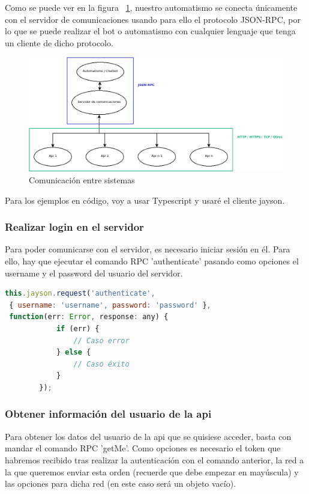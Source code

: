 \documentclass[spanish,12pt, a4paper, twoside]{paper}
\begin{document}
Como se puede ver en la figura ~\ref{fig:Comunicación entre sistemas}, nuestro automatismo se conecta únicamente con el servidor de comunicaciones usando para ello el protocolo JSON-RPC, por lo que se puede realizar el bot o automatismo con cualquier lenguaje que tenga un cliente de dicho protocolo.

\begin{figure}
\centering
	\includegraphics[width=\textwidth]{recursos/Comunication}
\caption{Comunicación entre sistemas}
\label{fig:Comunicación entre sistemas}
\end{figure}

Para los ejemplos en código, voy a usar Typescript y usaré el cliente jayson.

\subsubsection{Realizar login en el servidor}

Para poder comunicarse con el servidor, es necesario iniciar sesión en él. Para ello, hay que ejecutar el comando RPC 'authenticate' pasando como opciones el username y el password del usuario del servidor.

\begin{lstlisting}[language=Javascript]
this.jayson.request('authenticate',
 { username: 'username', password: 'password' },
 function(err: Error, response: any) {
			if (err) { 
				// Caso error
			} else {
				// Caso éxito
			}
		});
\end{lstlisting}

\subsubsection{Obtener información del usuario de la api}

Para obtener los datos del usuario de la api que se quisiese acceder, basta con mandar el comando RPC 'getMe'. Como opciones es necesario el token que habremos recibido tras realizar la autenticación con el comando anterior, la red a la que queremos enviar esta orden (recuerde que debe empezar en mayúscula) y las opciones para dicha red (en este caso será un objeto vacío).
\end{document}
